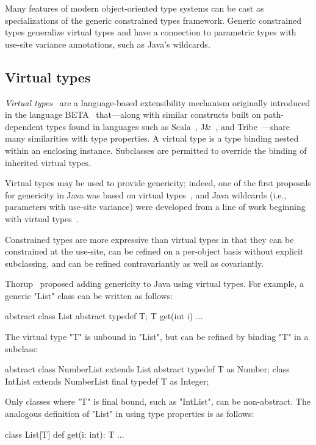 Many features of modern object-oriented type systems can be
cast as specializations of the generic constrained types
framework.  
Generic constrained types generalize virtual types and 
have a connection to parametric types with use-site variance
annotations, such as Java's wildcards.  

\subsection{Virtual types}

\emph{Virtual types}~\cite{beta,mp89-virtual-classes,ernst06-virtual}
are a language-based extensibility
mechanism 
originally introduced in the language
BETA~\cite{beta} that---along with
similar constructs built on path-dependent types found in
languages such as Scala~\cite{scala}, J\&~\cite{nqm06},
and Tribe~\cite{cdnw07-tribe}---share many similarities with type properties.
A virtual type is a type binding nested within an enclosing instance.
Subclasses are permitted to override the binding of inherited virtual types. 

Virtual types
may be used to provide genericity; indeed,
one of the first proposals for genericity in Java was based on
virtual types~\cite{thorup97}, and
Java
wildcards (i.e., parameters with use-site variance)
were developed from a line of work beginning with virtual
types~\cite{unifying-genericity,variant-parametric-types,adding-wildcards}.


Constrained types are more expressive than virtual
types in that they can be constrained at the use-site,
can be refined on a per-object basis without explicit subclassing,
and can be refined contravariantly as well as covariantly.

Thorup~\cite{thorup97}
proposed adding genericity to Java using virtual types.  For example,
a generic \xcd"List" class can be written as follows:
{
\begin{xten}
abstract class List {
  abstract typedef T;
  T get(int i) { ... }
}
\end{xten}}
\noindent
The virtual type \xcd"T" is unbound in \xcd"List", but 
can be refined by binding \xcd"T" in a subclass:
{
\begin{xten}
abstract class NumberList extends List {
  abstract typedef T as Number;
}
class IntList extends NumberList {
  final typedef T as Integer;
}
\end{xten}}
\noindent
Only classes where \xcd"T" is final bound, such as \xcd"IntList",
can be non-abstract.
%
The analogous definition of 
\xcd"List" in \Xten{} using type properties is as follows:
{
\begin{xten}
class List[T] {
  def get(i: int): T { ... }
}
\end{xten}}

